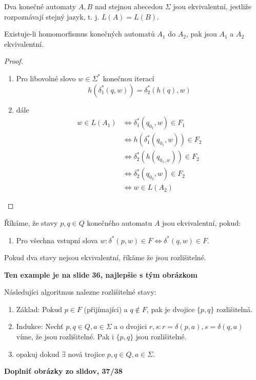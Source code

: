 \documentclass[../main.tex]{subfiles}
\begin{document}
\begin{definition}
    Dva konečné automaty $A,B$ nad stejnou abecedou $\Sigma$ jsou ekvivalentní, jestliže
    rozpoznávají stejný jazyk, t. j. $L(A) = L(B)$.
\end{definition}

\begin{theorem}
    Existuje-li homomorfismus konečných automatů $A_1$ do $A_2$, pak jsou $A_1$ a $A_2$
    ekvivalentní.
\end{theorem}
\begin{proof}
    \begin{enumerate}
        \item Pro libovolné slovo $w\in \Sigma^*$ konečnou iterací
        \[h(\delta^*_1(q,w)) = \delta^*_2(h(q),w)\]
        \item dále
        \begin{align*}
            w\in L(A_1) &\Leftrightarrow \delta^*_1(q_{0_1},w)\in F_1\\
            &\Leftrightarrow h(\delta^*_1(q_{0_1},w)) \in F_2\\
            &\Leftrightarrow \delta^*_2(h(q_{0_1,w}))\in F_2\\
            &\Leftrightarrow \delta^*_2(q_{0_2},w)\in F_2\\
            &\Leftrightarrow w\in L(A_2)
        \end{align*}
    \end{enumerate}
\end{proof}

\begin{definition}
    Říkáme, že stavy $p,q \in Q$ konečného automatu $A$ jsou ekvivalentní, pokud:
    \begin{enumerate}
        \item Pro všechna vstupní slova $w: \delta^*(p,w) \in F \Leftrightarrow \delta^*(q,w)\in F$.
    \end{enumerate}
    Pokud dva stavy nejsou ekvivalentní, říkáme že jsou rozlišitelné.
\end{definition}
\begin{example}
        \textbf{Ten example je na slide 36, najlepšie s tým obrázkom}
\end{example}

\begin{definition}
    Následujíci algoritmus nalezne rozlišitelné stavy:
    \begin{enumerate}
        \item Základ: Pokud $p\in F$ (přijímajíci) a $q \notin F$, pak je dvojice $\{p,q\}$ rozlišitelná.
        \item Indukce: Nechť $p,q\in Q, a \in \Sigma$ a o dvojici $r,s : r = \delta(p,a), s= \delta(q,a)$ víme,
        že jsou rozlišitelné. Pak i $\{p,q\}$ jsou rozlišitelné.
        \item opakuj dokud $\exists$ nová trojice $p,q\in Q, a\in \Sigma$.
    \end{enumerate}
    \textbf{Doplniť obrázky zo slidov, 37/38}
\end{definition}
\end{document}
